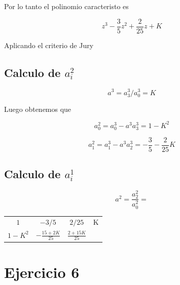 \documentclass{article}
\begin{document}
        Por lo tanto el polinomio caracteristo es 

        \begin{equation}
            z^3 - \frac{3}{5} z^2 + \frac{2}{25} z + K
        \end{equation}

        Aplicando el criterio de Jury 

        \subsection{Calculo de $a^2_i$}

            \begin{equation}
                a^3 = a^3_3 / a^3_0 = K
            \end{equation}

            Luego obtenemos que 

            \begin{equation}
                a^2_0 = a^3_0 - a^3a^3_3 = 1 - K^2
            \end{equation}

            \begin{equation}
                a^2_1 = a^3_1 - a^3a^3_2 = -\frac{3}{5} - \frac{2}{25} K 
            \end{equation}

           

        \subsection{Calculo de $a^1_i$}

            \begin{equation}
                a^2 = \frac{a^2_2}{a^2_0} = 
            \end{equation}

        \begin{table}
            \centering
            \begin{tabular}{|c|c|c|c|} 
                $1$ & $-3/5$ & $2/25$ & K \\
                $1-K^2$ & $-\frac{15+2K}{25}$ & $\frac{2+15K}{25}$ \\
                
            \end{tabular}
        \end{table}

    \section{Ejercicio 6}
\end{document}
